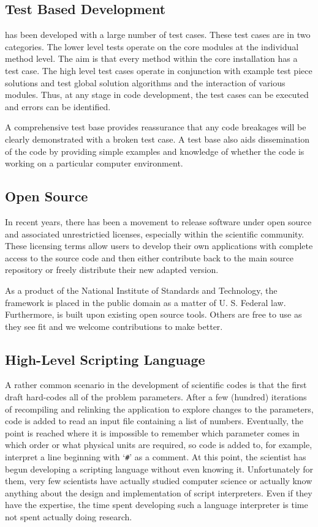 \subsection{Test Based Development}

\FiPy{} has been developed with a large number of test cases.  These
test cases are in two categories.  The lower level tests operate on
the core modules at the individual method level.  The aim is that
every method within the core installation has a test case.  The high
level test cases operate in conjunction with example test piece
solutions and test global solution algorithms and the interaction of
various modules.  Thus, at any stage in code development, the test cases
can be executed and errors can be identified.

A comprehensive test base provides reassurance that any code breakages
will be clearly demonstrated with a broken test case.  A test base
also aids dissemination of the code by providing simple examples and
knowledge of whether the code is working on a particular computer
environment.

\subsection{Open Source}

In recent years, there has been a movement to release software under
open source and associated unrestrictied licenses, especially within
the scientific community.  These licensing terms allow users to
develop their own applications with complete access to the source code
and then either contribute back to the main source repository or
freely distribute their new adapted version.  

As a product of the National Institute of Standards and Technology,
the \FiPy{} framework is placed in the public domain as a matter of U.
S. Federal law. Furthermore, \FiPy{} is built upon existing open source 
tools. Others are free to use \FiPy{} as they see fit and we welcome
contributions to make \FiPy{} better.

\subsection{High-Level Scripting Language}

A rather common scenario in the development of scientific codes is
that the first draft hard-codes all of the problem parameters.  After
a few (hundred) iterations of recompiling and relinking the
application to explore changes to the parameters, code is added to
read an input file containing a list of numbers.  Eventually, the
point is reached where it is impossible to remember which parameter
comes in which order or what physical units are required, so code is
added to, for example, interpret a line beginning with `\verb|#|' as a
comment.  At this point, the scientist has begun developing a
scripting language without even knowing it.  Unfortunately for them,
very few scientists have actually studied computer science or actually
know anything about the design and implementation of script
interpreters.  Even if they have the expertise, the time spent
developing such a language interpreter is time not spent actually
doing research.

